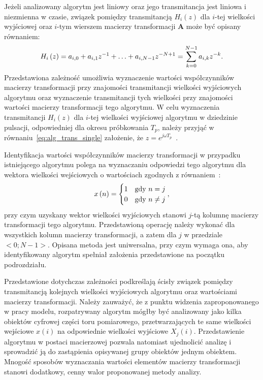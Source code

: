 Jeżeli analizowany algorytm jest liniowy oraz jego transmitancja jest liniowa i niezmienna w czasie, związek pomiędzy transmitancją $H_{i}(z)$ dla $i$-tej wielkości wyjściowej oraz $i$-tym wierszem macierzy transformacji $\mathbf{A}$ może być opisany równaniem:
\begin{equation}
H_{i} \left(z\right) = a_{i, 0} + a_{i, 1} z^{-1} + \hdots + a_{i, N-1} z^{-N+1} = \sum _{k = 0} ^{N-1} a_{i, k} z^{-k} \label{eq:alg_trans_single}.
\end{equation}
Przedstawiona zależność umożliwia wyznaczenie wartości współczynników macierzy transformacji przy znajomości transmitancji wielkości wyjściowych algorytmu oraz wyznaczenie transmitancji tych wielkości przy znajomości wartości macierzy transformacji tego algorytmu. W celu wyznaczenia transmitancji $H_{i}(z)$ dla $i$-tej wielkości wyjściowej algorytmu w dziedzinie pulsacji, odpowiedniej dla okresu próbkowania $T_{p}$, należy przyjąć w równaniu~\eqref{eq:alg_trans_single} założenie, że $z = e^{j\omega T_{p}}$~\cite{proakis_dsp}.

Identyfikacja wartości współczynników macierzy transformacji w przypadku istniejącego algorytmu polega na wyznaczaniu odpowiedzi tego algorytmu dla wektora wielkości wejściowych o wartościach zgodnych z równaniem~\cite{jakubiec_algorithms, jakubiec_system}:
\begin{equation}
x \emb{n} =
\begin{cases}
	1 & $gdy$~n = j \\
	0 & $gdy$~n \neq j
\end{cases}
\label{eq:wt_ident},
\end{equation}
przy czym uzyskany wektor wielkości wyjściowych stanowi $j$-tą kolumnę macierzy transformacji tego algorytmu. Przedstawioną operację należy wykonać dla wszystkich kolumn macierzy transformacji, a zatem dla $j$ w przedziale $<0;N-1>$. Opisana metoda jest uniwersalna, przy czym wymaga ona, aby identyfikowany algorytm spełniał założenia przedstawione na początku podrozdziału.

Przedstawione dotychczas zależności podkreślają ścisły związek pomiędzy transmitancją kolejnych wielkości wyjściowych algorytmu oraz wartościami macierzy transformacji. Należy zauważyć, że z punktu widzenia zaproponowanego w pracy modelu, rozpatrywany algorytm mógłby być analizowany jako kilka obiektów cyfrowej części toru pomiarowego, przetwarzających te same wielkości wejściowe $x(i)$ na odpowiednie wielkości wyjściowe $X_{j}(i)$. Przedstawienie algorytmu w postaci macierzowej pozwala natomiast ujednolicić analizę i sprowadzić ją do zastąpienia opisywanej grupy obiektów jednym obiektem. Mnogość sposobów wyznaczania wartości elementów macierzy transformacji stanowi dodatkowy, cenny walor proponowanej metody analizy.

